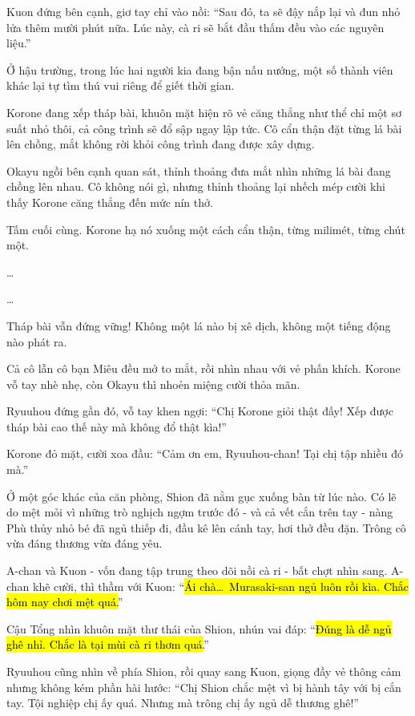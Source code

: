 \documentclass[../main.tex]{subfiles}
\begin{document}
Kuon đứng bên cạnh, giơ tay chỉ vào nồi: ``Sau đó, ta sẽ đậy nắp lại và đun nhỏ lửa thêm mười phút nữa. Lúc này, cà ri sẽ bắt đầu thấm đều vào các nguyên liệu.''

Ở hậu trường, trong lúc hai người kia đang bận nấu nướng, một số thành viên khác lại tự tìm thú vui riêng để giết thời gian.

Korone đang xếp tháp bài, khuôn mặt hiện rõ vẻ căng thẳng như thể chỉ một sơ suất nhỏ thôi, cả công trình sẽ đổ sập ngay lập tức. Cô cẩn thận đặt từng lá bài lên chồng, mắt không rời khỏi công trình đang được xây dựng.

Okayu ngồi bên cạnh quan sát, thỉnh thoảng đưa mắt nhìn những lá bài đang chồng lên nhau. Cô không nói gì, nhưng thỉnh thoảng lại nhếch mép cười khi thấy Korone căng thẳng đến mức nín thở.


Tấm cuối cùng. Korone hạ nó xuống một cách cẩn thận, từng milimét, từng chút một.

\dots

\dots

Tháp bài vẫn đứng vững! Không một lá nào bị xê dịch, không một tiếng động nào phát ra.

Cả cô lẫn cô bạn Miêu đều mở to mắt, rồi nhìn nhau với vẻ phấn khích. Korone vỗ tay nhè nhẹ, còn Okayu thì nhoẻn miệng cười thỏa mãn.

Ryuuhou đứng gần đó, vỗ tay khen ngợi: ``Chị Korone giỏi thật đấy! Xếp được tháp bài cao thế này mà không đổ thật kìa!''

Korone đỏ mặt, cười xoa đầu: ``Cảm ơn em, Ryuuhou-chan! Tại chị tập nhiều đó mà.''

Ở một góc khác của căn phòng, Shion đã nằm gục xuống bàn từ lúc nào. Có lẽ do mệt mỏi vì những trò nghịch ngợm trước đó - và cả vết cắn trên tay - nàng Phù thủy nhỏ bé đã ngủ thiếp đi, đầu kê lên cánh tay, hơi thở đều đặn. Trông cô vừa đáng thương vừa đáng yêu.


A-chan và Kuon - vốn đang tập trung theo dõi nồi cà ri - bất chợt nhìn sang. A-chan khẽ cười, thì thầm với Kuon: ``\hl{Ái chà\dots\ Murasaki-san ngủ luôn rồi kìa. Chắc hôm nay chơi mệt quá.}''

Cậu Tổng nhìn khuôn mặt thư thái của Shion, nhún vai đáp: ``\hl{Đúng là dễ ngủ ghê nhỉ. Chắc là tại mùi cà ri thơm quá.}''

Ryuuhou cũng nhìn về phía Shion, rồi quay sang Kuon, giọng đầy vẻ thông cảm nhưng không kém phần hài hước: ``Chị Shion chắc mệt vì bị hành tây với bị cắn tay. Tội nghiệp chị ấy quá. Nhưng mà trông chị ấy ngủ dễ thương ghê!''
\end{document}
